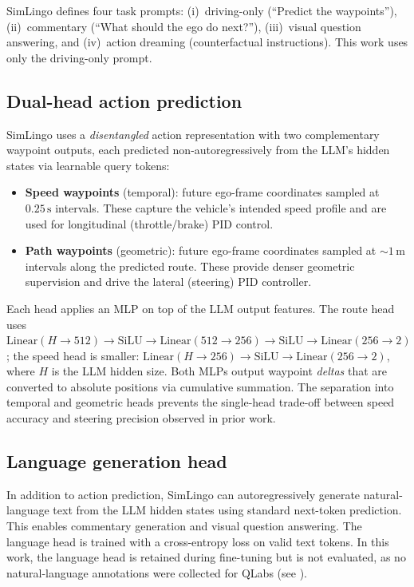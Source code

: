 SimLingo defines four task prompts: (i)~driving-only (``Predict the waypoints''), (ii)~commentary (``What should the ego do next?''), (iii)~visual question answering, and (iv)~action dreaming (counterfactual instructions). This work uses only the driving-only prompt.

\subsection{Dual-head action prediction}
\label{sec:dual-head}
SimLingo uses a \emph{disentangled} action representation with two complementary waypoint outputs, each predicted non-autoregressively from the LLM's hidden states via learnable query tokens:
\begin{itemize}[leftmargin=*,itemsep=0.25em]
  \item \textbf{Speed waypoints} (temporal): future ego-frame coordinates sampled at $0.25\,\text{s}$ intervals. These capture the vehicle's intended speed profile and are used for longitudinal (throttle/brake) PID control.
  \item \textbf{Path waypoints} (geometric): future ego-frame coordinates sampled at ${\sim}1\,\text{m}$ intervals along the predicted route. These provide denser geometric supervision and drive the lateral (steering) PID controller.
\end{itemize}
Each head applies an MLP on top of the LLM output features. The route head uses $\text{Linear}(H{\to}512) \to \text{SiLU} \to \text{Linear}(512{\to}256) \to \text{SiLU} \to \text{Linear}(256{\to}2)$; the speed head is smaller: $\text{Linear}(H{\to}256) \to \text{SiLU} \to \text{Linear}(256{\to}2)$, where $H$ is the LLM hidden size. Both MLPs output waypoint \emph{deltas} that are converted to absolute positions via cumulative summation. The separation into temporal and geometric heads prevents the single-head trade-off between speed accuracy and steering precision observed in prior work.

\subsection{Language generation head}
In addition to action prediction, SimLingo can autoregressively generate natural-language text from the LLM hidden states using standard next-token prediction. This enables commentary generation and visual question answering. The language head is trained with a cross-entropy loss on valid text tokens. In this work, the language head is retained during fine-tuning but is not evaluated, as no natural-language annotations were collected for QLabs (see ).

